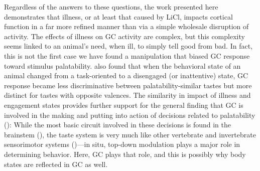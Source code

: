 \begin{refsection}
Regardless of the answers to these questions, the work presented here demonstrates that illness, or at least that caused by LiCl, impacts cortical function in a far more refined manner than via a simple wholesale disruption of activity. The effects of illness on GC activity are complex, but this complexity seems linked to an animal’s need, when ill, to simply tell good from bad. In fact, this is not the first case we have found a manipulation that biased GC response toward stimulus palatability. \cite{fontanini2006a} also found that when the behavioral state of an animal changed from a task-oriented to a disengaged (or inattentive) state, GC response became less discriminative between palatability-similar tastes but more distinct for tastes with opposite valences. The similarity in impact of illness and engagement states provides further support for the general finding that GC is involved in the making and putting into action of decisions related to palatability (\cite{sadacca2016a,mukherjee2019a}): While the most basic circuit involved in these decisions is found in the brainstem (\cite{grill1978a,grill1978b,geran2006a}), the taste system is very much like other vertebrate and invertebrate sensorimotor systems (\cite{geran2006a})—in situ, top-down modulation plays a major role in determining behavior. Here, GC plays that role, and this is possibly why body states are reflected in GC as well.

\printbibliography[title={References}]

\end{refsection}